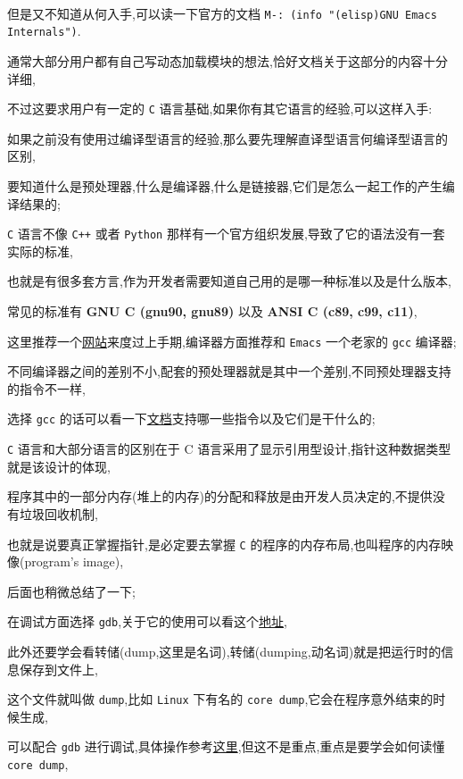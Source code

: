\documentclass[11pt]{article}
\begin{document}
\\[0pt]


但是又不知道从何入手,可以读一下官方的文档 \texttt{M-: (info "(elisp)GNU Emacs Internals")}.

通常大部分用户都有自己写动态加载模块的想法,恰好文档关于这部分的内容十分详细,

不过这要求用户有一定的 \texttt{C} 语言基础,如果你有其它语言的经验,可以这样入手:

如果之前没有使用过编译型语言的经验,那么要先理解直译型语言何编译型语言的区别,

要知道什么是预处理器,什么是编译器,什么是链接器,它们是怎么一起工作的产生编译结果的;

\texttt{C} 语言不像 \texttt{C++} 或者 \texttt{Python} 那样有一个官方组织发展,导致了它的语法没有一套实际的标准,

也就是有很多套方言,作为开发者需要知道自己用的是哪一种标准以及是什么版本,

常见的标准有 \textbf{GNU C (gnu90, gnu89)} 以及 \textbf{ANSI C (c89, c99, c11)},

这里推荐一个\href{https://www.studytonight.com/c/}{网站}来度过上手期,编译器方面推荐和 \texttt{Emacs} 一个老家的 \texttt{gcc} 编译器;

不同编译器之间的差别不小,配套的预处理器就是其中一个差别,不同预处理器支持的指令不一样,

选择 \texttt{gcc} 的话可以看一下\href{https://gcc.gnu.org/onlinedocs/gcc-10.2.0/cpp/}{文档}支持哪一些指令以及它们是干什么的;

\texttt{C} 语言和大部分语言的区别在于 C 语言采用了显示引用型设计,指针这种数据类型就是该设计的体现,

程序其中的一部分内存(堆上的内存)的分配和释放是由开发人员决定的,不提供没有垃圾回收机制,

也就是说要真正掌握指针,是必定要去掌握 \texttt{C} 的程序的内存布局,也叫程序的内存映像(program's image),

后面也稍微总结了一下;

在调试方面选择 \texttt{gdb},关于它的使用可以看这个\href{http://heather.cs.ucdavis.edu/\~matloff/UnixAndC/CLanguage/Debug.html}{地址},

此外还要学会看转储(dump,这里是名词),转储(dumping,动名词)就是把运行时的信息保存到文件上,

这个文件就叫做 \texttt{dump},比如 \texttt{Linux} 下有名的 \texttt{core dump},它会在程序意外结束的时候生成,

可以配合 \texttt{gdb} 进行调试,具体操作参考\href{https://wiki.archlinux.org/index.php/Core\_dump}{这里},但这不是重点,重点是要学会如何读懂 \texttt{core dump},
\end{document}
